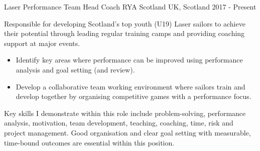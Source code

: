 \begin{cventries}
  \cventry
    {Laser Performance Team Head Coach} %
    {RYA Scotland} %
    {UK, Scotland} %
    {2017 - Present} %
    {
      Responsible for developing Scotland’s top youth (U19) Laser sailors to achieve their potential through leading regular training camps and providing coaching support at major events. 
      \begin{itemize}
          \item Identify key areas where performance can be improved using performance analysis and goal setting (and review).
          \item Develop a collaborative team working environment where sailors train and develop together by organising competitive games with a performance focus.
      \end{itemize}
      Key skills I demonstrate within this role include problem-solving, performance analysis, motivation, team development, teaching, coaching, time, risk and project management. Good organisation and clear goal setting with measurable, time-bound outcomes are essential within this position.
     }


\end{cventries}
